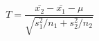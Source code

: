 \documentclass[10pt]{article}
\begin{document}
\[T=\frac{\bar{x_2}-\bar{x_1}-\mu}{\sqrt{s_1^2/n_1+s_2^2/n_2}}

\]
\end{document}
